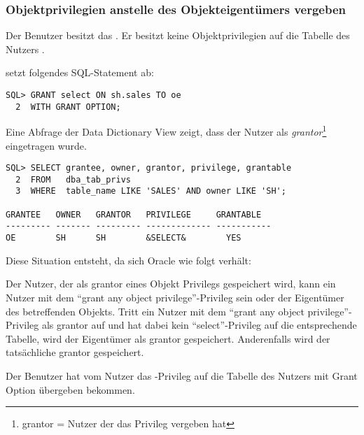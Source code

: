         \subsubsection{Objektprivilegien anstelle des Objekteigent\"umers vergeben}
        \label{grantingobjectspriveonbehalfofowner}
          Der Benutzer  besitzt das . Er besitzt keine Objektprivilegien auf die Tabelle  des Nutzers .

           setzt folgendes SQL-Statement ab:
          \begin{lstlisting}[caption={\identifier{hr} erteilt \identifier{oe} das SELECT-Privileg auf \identifier{sh.sales}},label=admin238,language=oracle_sql]
SQL> GRANT select ON sh.sales TO oe
  2  WITH GRANT OPTION;
          \end{lstlisting}
          Eine Abfrage der Data Dictionary View  zeigt, dass der Nutzer  als \textit{grantor}\footnote{grantor = Nutzer der das Privileg vergeben hat} eingetragen wurde.
          \begin{lstlisting}[caption={Abfrage der View \identifier{dba\_tab\_privs} - 1},language=oracle_sql,label=admin239,language=oracle_sql]
SQL> SELECT grantee, owner, grantor, privilege, grantable
  2  FROM   dba_tab_privs
  3  WHERE  table_name LIKE 'SALES' AND owner LIKE 'SH';

GRANTEE   OWNER   GRANTOR   PRIVILEGE     GRANTABLE
--------- ------- --------- ------------- -----------
OE        SH      SH        &SELECT&        YES
          \end{lstlisting}
          Diese Situation entsteht, da sich Oracle wie folgt verh\"alt:

          Der Nutzer, der als grantor eines Objekt Privilegs gespeichert wird, kann ein Nutzer mit dem \enquote{grant any object privilege}-Privileg sein oder der Eigent\"umer des betreffenden Objekts. Tritt ein Nutzer mit dem \enquote{grant any object privilege}-Privileg als grantor auf und hat dabei kein \enquote{select}-Privileg auf die entsprechende Tabelle, wird der Eigent\"umer als grantor gespeichert. Anderenfalls wird der tats\"achliche grantor gespeichert.

          Der Benutzer  hat vom Nutzer  das -Privileg auf die Tabelle  des Nutzers  mit Grant Option \"ubergeben bekommen.


